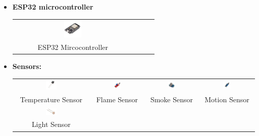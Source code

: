 \begin{itemize}
    \item \textbf{ESP32 microcontroller}
    \begin{tabular}{cccc}
        \includegraphics[width=0.15\textwidth]{figs/esp.png} \\
        ESP32 Mircocontroller \\
    \end{tabular}
    
    \item \textbf{Sensors:}
    
    \begin{tabular}{cccc}
        \includegraphics[width=0.15\textwidth]{figs/temp.png} &
        \includegraphics[width=0.15\textwidth]{figs/flame.png} &
        \includegraphics[width=0.15\textwidth]{figs/smoke.png} &
        \includegraphics[width=0.15\textwidth]{figs/ir.png} \\
        
        Temperature Sensor & Flame Sensor & Smoke Sensor & Motion Sensor \\
        
        \includegraphics[width=0.15\textwidth]{figs/ldr.png} \\        
        Light Sensor \\
    \end{tabular}


\end{itemize}
